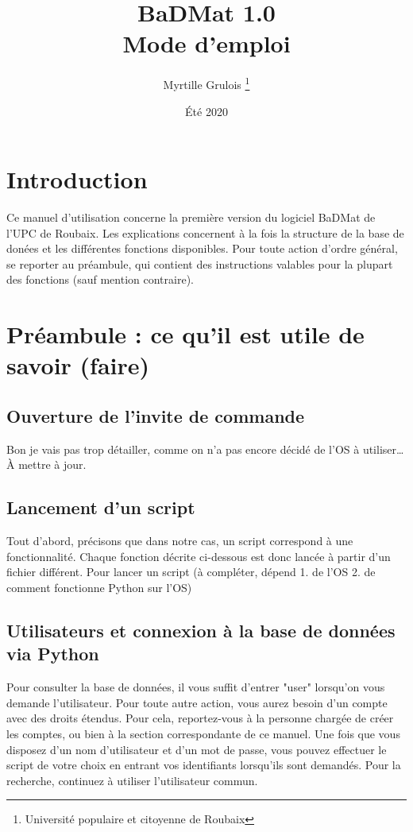 \documentclass[12pt,a4paper]{article}
\title{\Huge BaDMat 1.0 \\ \LARGE Mode d'emploi} %
\author{Myrtille Grulois \thanks{Université populaire et citoyenne de Roubaix}}
\date{Été 2020}
\begin{document}
\begin{titlepage}
\maketitle
\end{titlepage}

\tableofcontents
\clearpage

\section*{Introduction}

Ce manuel d'utilisation concerne la première version du logiciel BaDMat de l'UPC de Roubaix.
Les explications concernent à la fois la structure de la base de donées et les différentes fonctions disponibles.
Pour toute action d'ordre général, se reporter au préambule, qui contient des instructions valables pour la plupart des fonctions (sauf mention contraire).

\bigskip
\section{Préambule : ce qu'il est utile de savoir (faire)}

\subsection{Ouverture de l'invite de commande}

    Bon je vais pas trop détailler, comme on n'a pas encore décidé de l'OS à utiliser\dots
    À mettre à jour.


\bigskip
\subsection{Lancement d'un script}
    Tout d'abord, précisons que dans notre cas, un script correspond à une fonctionnalité.
    Chaque fonction décrite ci-dessous est donc lancée à partir d'un fichier différent.
    Pour lancer un script (à compléter, dépend 1. de l'OS 2. de comment fonctionne Python sur l'OS)


\bigskip
\subsection{Utilisateurs et connexion à la base de données via Python}
    Pour consulter la base de données, il vous suffit d'entrer "user" lorsqu'on vous demande l'utilisateur.
    Pour toute autre action, vous aurez besoin d'un compte avec des droits étendus.
    Pour cela, reportez-vous à la personne chargée de créer les comptes, ou bien à la section correspondante de ce manuel.
    Une fois que vous disposez d'un nom d'utilisateur et d'un mot de passe, vous pouvez effectuer le script de
    votre choix en entrant vos identifiants lorsqu'ils sont demandés. Pour la recherche, continuez à utiliser l'utilisateur commun.
\end{document}
